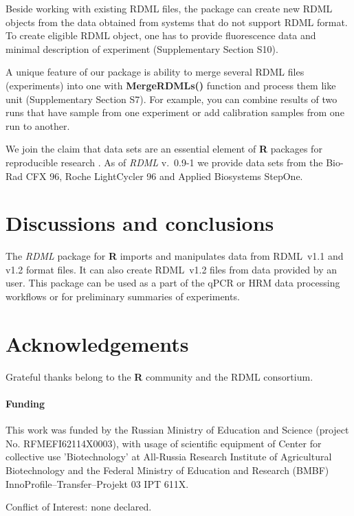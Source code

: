 \documentclass{bioinfo}
\begin{document}
	Beside working with existing RDML files, the package can create new RDML objects from
	the data obtained from systems that do not support RDML format. To create eligible RDML 
	object, one has to provide fluorescence data and minimal description of experiment
	(Supplementary Section S10).
	
	A unique feature of our package is ability to merge several RDML files
	(experiments) into one with \textbf{MergeRDMLs()} function and process them like
	unit (Supplementary Section S7). For example, you can combine results of two
	runs that have sample from one experiment or add calibration samples from one
	run to another.
	
	We join the claim that data sets are an essential element of \textbf{R} 
	packages for reproducible research \cite{roediger2015r}. As of \textit{RDML} 
	v.~0.9-1 we provide data sets from the Bio-Rad CFX 96, Roche LightCycler 96 and 
	Applied Biosystems StepOne.
	
	\section{Discussions and conclusions}
	
	The \textit{RDML} package for \textbf{R} imports and manipulates data from RDML~v1.1 and 
	v1.2 format files. It can also create RDML~v1.2 files from data provided by an user. 
	This package can be used as a part of the qPCR or HRM data processing workflows or 
	for preliminary summaries of experiments.
		
	\section{Acknowledgements}
	Grateful thanks belong to the \textbf{R} community and the RDML consortium.
	
	\paragraph{Funding\textcolon} This work was funded by the Russian 
	Ministry of Education and Science (project No. RFMEFI62114X0003), with usage of 
	scientific equipment of Center for collective use ’Biotechnology’ at All-Russia 
	Research Institute of Agricultural Biotechnology and the Federal Ministry of 
	Education and Research (BMBF) InnoProfile--Transfer--Projekt 03 IPT 611X.
	
	
	Conflict of Interest: none declared.

	
	
\end{document}
